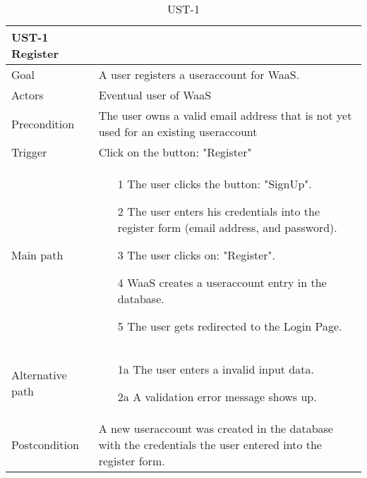 \documentclass[titlepage, 12pt]{article}
\begin{document}
\begin{table}[H]
  \begin{center}

    \begin{tabular}{p{4cm}|p{10cm}}
      \textbf{UST-1 Register}                                                                                                        \\
      \hline
      Goal             & A user registers a useraccount for WaaS.                                                                    \\
      \hline
      Actors           & Eventual user of WaaS                                                                                       \\
      \hline
      Precondition     & The user owns a valid email address that is not yet used for an existing useraccount                        \\
      \hline
      Trigger          & Click on the button: "Register"                                                                             \\
      \hline
      Main path        &
      \begin{itemize}
        \item [1] The user clicks the button: "SignUp".
        \item [2] The user enters his credentials into the register form (email address, and password).
        \item [3] The user clicks on: "Register".
        \item [4] WaaS creates a useraccount entry in the database.
        \item [5] The user gets redirected to the Login Page.
      \end{itemize}                                                                                                      \\
      \hline
      Alternative path &
      \begin{itemize}
        \item [1a] The user enters a invalid input data.
        \item [2a] A validation error message shows up.
      \end{itemize}                                                                                                      \\
      \hline
      Postcondition    & A new useraccount was created in the database with the credentials the user entered into the register form. \\
    \end{tabular}

    \caption{UST-1}
    \label{table:UST-1}

  \end{center}
\end{table}
\end{document}
